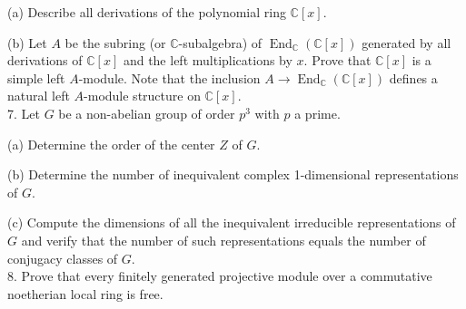 \documentclass[11pt]{article}
\newcommand{\C}{\mathbb{C}}
\DeclareMathOperator{\End}{End}
\begin{document}
(a) Describe all derivations of the polynomial ring $\C[x]$.

(b) Let $A$ be the subring (or $\C$-subalgebra) of $\End_\C(\C[x])$ generated by all derivations of $\C[x]$ and the left multiplications by $x$. Prove that $\C[x]$ is a simple left $A$-module. Note that the inclusion $A\to \End_\C(\C[x])$ defines a natural left $A$-module structure on $\C[x]$. \\


7. Let $G$ be a non-abelian group of order $p^3$ with $p$ a prime.

(a) Determine the order of the center $Z$ of $G$.

(b) Determine the number of inequivalent complex 1-dimensional representations of $G$. 

(c) Compute the dimensions of all the inequivalent irreducible representations of $G$ and verify that the number of such representations equals the number of conjugacy classes of $G$. \\

8.  Prove that every finitely generated projective module over a commutative
noetherian local ring is free.
\end{document}
